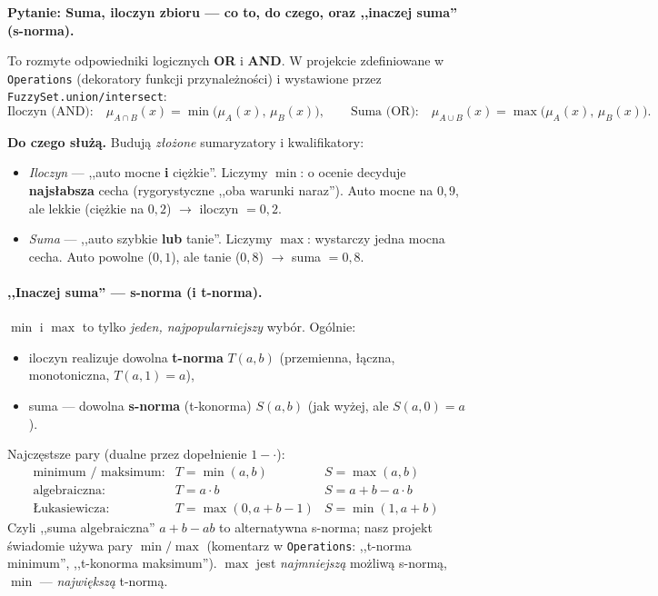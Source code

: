 \documentclass[11pt]{article}
\newcommand{\code}[1]{\texttt{#1}}
\newcommand{\pyt}[1]{\medskip\noindent\textbf{\textcolor{mkbg}{Pytanie:} #1}\par\smallskip}
\begin{document}
\pyt{Suma, iloczyn zbioru --- co to, do czego, oraz ,,inaczej suma'' (s-norma).}

To rozmyte odpowiedniki logicznych \textbf{OR} i \textbf{AND}. W projekcie zdefiniowane
w \code{Operations} (dekoratory funkcji przynależności) i wystawione przez
\code{FuzzySet.union/intersect}:
\[
  \text{Iloczyn (AND):}\quad \mu_{A\cap B}(x) = \min\big(\mu_A(x),\,\mu_B(x)\big),
\qquad
  \text{Suma (OR):}\quad \mu_{A\cup B}(x) = \max\big(\mu_A(x),\,\mu_B(x)\big).
\]

\textbf{Do czego służą.} Budują \emph{złożone} sumaryzatory i kwalifikatory:
\begin{itemize}[leftmargin=*]
\item \emph{Iloczyn} --- ,,auto mocne \textbf{i} ciężkie''. Liczymy $\min$: o ocenie
  decyduje \textbf{najsłabsza} cecha (rygorystyczne ,,oba warunki naraz''). Auto mocne na
  $0{,}9$, ale lekkie (ciężkie na $0{,}2$) $\to$ iloczyn $=0{,}2$.
\item \emph{Suma} --- ,,auto szybkie \textbf{lub} tanie''. Liczymy $\max$: wystarczy jedna
  mocna cecha. Auto powolne ($0{,}1$), ale tanie ($0{,}8$) $\to$ suma $=0{,}8$.
\end{itemize}

\paragraph{,,Inaczej suma'' --- s-norma (i t-norma).} $\min$ i $\max$ to tylko
\emph{jeden, najpopularniejszy} wybór. Ogólnie:
\begin{itemize}[leftmargin=*]
\item iloczyn realizuje dowolna \textbf{t-norma} $T(a,b)$ (przemienna, łączna, monotoniczna,
  $T(a,1)=a$),
\item suma --- dowolna \textbf{s-norma} (t-konorma) $S(a,b)$ (jak wyżej, ale $S(a,0)=a$).
\end{itemize}
Najczęstsze pary (dualne przez dopełnienie $1-\cdot$):
\[
\begin{array}{lll}
\text{minimum / maksimum:} & T=\min(a,b) & S=\max(a,b)\\[2pt]
\text{algebraiczna:} & T=a\cdot b & S=a+b-a\cdot b\\[2pt]
\text{Łukasiewicza:} & T=\max(0,a+b-1) & S=\min(1,a+b)
\end{array}
\]
Czyli ,,suma algebraiczna'' $a+b-ab$ to alternatywna s-norma; nasz projekt świadomie używa
pary $\min/\max$ (komentarz w \code{Operations}: ,,t-norma minimum'', ,,t-konorma
maksimum''). $\max$ jest \emph{najmniejszą} możliwą s-normą, $\min$ --- \emph{największą}
t-normą.
\end{document}
